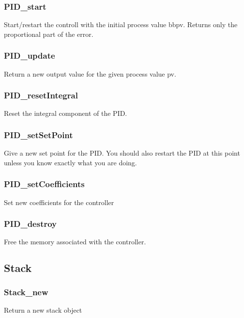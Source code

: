 \subsubsection{PID\_start} \label{apipidstart}
 Start/restart the controll with
the initial process value bbpv. Returns only the proportional part of the error.

\subsubsection{PID\_update} \label{apipidupdate}
 Return a new output value for the
given process value pv.

\subsubsection{PID\_resetIntegral} \label{apipidresetint}
 Reset the integral component of the PID.

\subsubsection{PID\_setSetPoint} \label{apipidsetsp}
 Give a new set point for the
PID. You should also restart the PID at this point unless you know exactly what
you are doing.

\subsubsection{PID\_setCoefficients} \label{apipidsetcoff}
 Set new
coefficients for the controller

\subsubsection{PID\_destroy} \label{apipiddestroy}
 Free the memory associated with the
controller.

\subsection{Stack} \label{apistack}
\subsubsection{Stack\_new} \label{apistacknew}
 Return a new stack object

